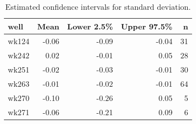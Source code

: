 \begin{table}[ht]
\centering
\begin{tabular}{lrrrr}
  \hline
well & Mean & Lower 2.5\% & Upper 97.5\% & n \\ 
  \hline
wk124 & -0.06 & -0.09 & -0.04 &  31 \\ 
  wk242 & 0.02 & -0.01 & 0.05 &  28 \\ 
  wk251 & -0.02 & -0.03 & -0.01 &  30 \\ 
  wk263 & -0.01 & -0.02 & -0.01 &  64 \\ 
  wk270 & -0.10 & -0.26 & 0.05 &   5 \\ 
  wk271 & -0.06 & -0.21 & 0.09 &   6 \\ 
   \hline
\end{tabular}
\caption{Estimated confidence intervals for standard deviation.} 
\label{tab:sd}
\end{table}

